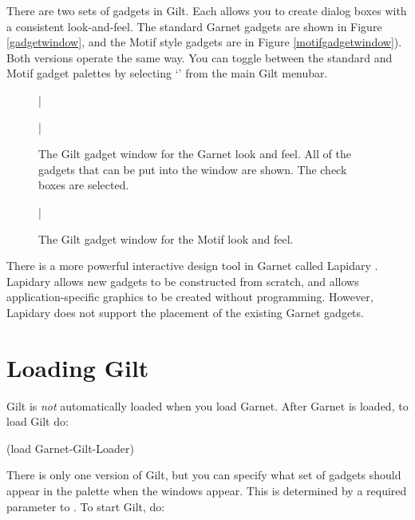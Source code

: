 There are two sets of gadgets in Gilt.  Each allows you to create dialog boxes
with a consistent look-and-feel.  The standard Garnet gadgets are shown in
Figure \ref{gadgetwindow}, and the Motif style gadgets are in Figure
\ref{motifgadgetwindow}).  Both versions operate the same way.  You can
toggle between the standard and Motif gadget palettes by selecting
`' from the main Gilt menubar.



\begin{figure}
\bar{}
\begin{center}
\end{center}
\caption{The Gilt gadget window for the Garnet look and feel.  All of
the gadgets that can be put into the window are shown.  The check
boxes are selected.}
\bar{}
\end{figure}

\begin{figure}
\begin{center}
\end{center}
\caption{The Gilt gadget window for the Motif look and feel.}
\bar{}
\end{figure}

There is a more powerful interactive design tool in Garnet called Lapidary
\cite{garnetLapidary}.  Lapidary allows new gadgets to be constructed
from scratch, and allows application-specific graphics to be created
without programming.  However, Lapidary does not support the placement of
the existing Garnet gadgets.

\section{Loading Gilt}

Gilt is {\it not} automatically loaded when you load Garnet.  After Garnet
is loaded, to load Gilt do:
\begin{programexample}
(load Garnet-Gilt-Loader)
\end{programexample}

There is only one version of Gilt, but you can specify what set of gadgets
should appear in the palette when the windows appear.  This is determined
by a required parameter to .  To start Gilt, do:

